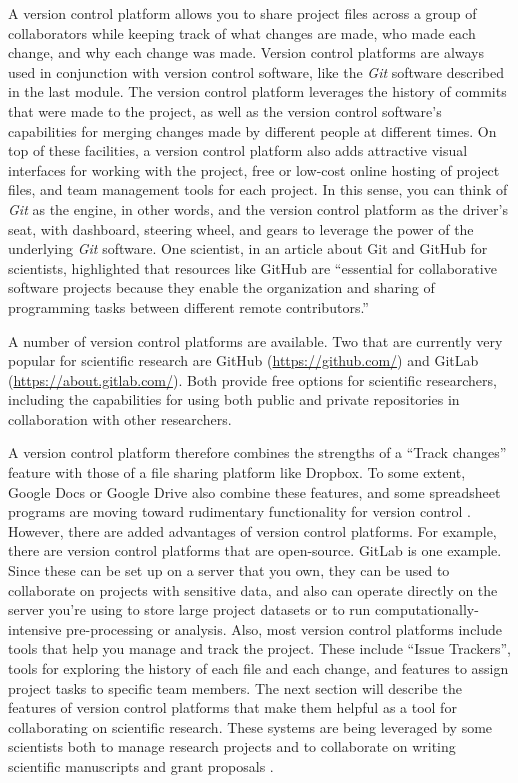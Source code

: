 \documentclass[]{tufte-book}
\begin{document}
A version control platform allows you to share project files across a group of
collaborators while keeping track of what changes are made, who made each
change, and why each change was made. Version control platforms are always used
in conjunction with version control software, like the \emph{Git} software described
in the last module. The version control platform leverages the history of
commits that were made to the project, as well as the version control software's
capabilities for merging changes made by different people at different times. On
top of these facilities, a version control platform also adds attractive visual
interfaces for working with the project, free or low-cost online hosting of
project files, and team management tools for each project. In this sense, you
can think of \emph{Git} as the engine, in other words, and the version control
platform as the driver's seat, with dashboard, steering wheel, and gears to
leverage the power of the underlying
\emph{Git} software. One scientist, in an article about Git and GitHub for
scientists, highlighted that resources like GitHub are ``essential for
collaborative software projects because they enable the organization and sharing
of programming tasks between different remote contributors.'' \citep{perez2016ten}

A number of version control platforms are available. Two that are currently very
popular for scientific research are GitHub (\url{https://github.com/}) and GitLab
(\url{https://about.gitlab.com/}). Both provide free options for scientific
researchers, including the capabilities for using both public and private
repositories in collaboration with other researchers.

A version control platform therefore combines the strengths of a ``Track changes''
feature with those of a file sharing platform like Dropbox. To some extent,
Google Docs or Google Drive also combine these features, and some spreadsheet
programs are moving toward rudimentary functionality for version control
\citep{birch2018future}. However, there are added advantages of version control
platforms. For example, there are version control platforms that are
open-source. GitLab is one example. Since these can be set up on a server that
you own, they can be used to collaborate on projects with sensitive data, and
also can operate directly on the server you're using to store large
project datasets or to run computationally-intensive pre-processing or analysis.
Also, most version control platforms include tools that help you manage and
track the project. These include ``Issue Trackers'', tools for exploring the
history of each file and each change, and features to assign project tasks to
specific team members. The next section will describe the features of version
control platforms that make them helpful as a tool for collaborating on
scientific research. These systems are being leveraged by some scientists both
to manage research projects and to collaborate on writing scientific manuscripts
and grant proposals \citep{perez2016ten}.
\end{document}
